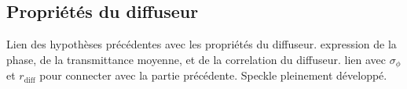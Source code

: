 \subsection{Propriétés du diffuseur}
\label{sec:propriete_diffuseur}
Lien des hypothèses précédentes avec les propriétés du diffuseur.
expression de la phase, de la transmittance moyenne, et de la correlation du diffuseur. lien avec $\sigma_\phi$ et $r_{\mathrm{diff}}$ pour connecter avec la partie précédente. Speckle pleinement développé.

